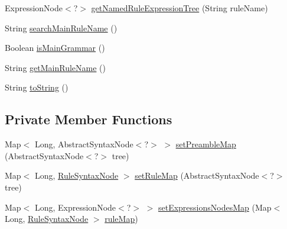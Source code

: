 \begin{DoxyCompactItemize}
\item 
Expression\-Node$<$?$>$ \hyperlink{classit_1_1emarolab_1_1cagg_1_1core_1_1language_1_1syntax_1_1GrammarPrimitive_a2e8aaff9990813d6a7c3d4f7888ac2d0}{get\-Named\-Rule\-Expression\-Tree} (String rule\-Name)
\item 
String \hyperlink{classit_1_1emarolab_1_1cagg_1_1core_1_1language_1_1syntax_1_1GrammarPrimitive_af96e79b0d9f2caadf59f3fba2c7da478}{search\-Main\-Rule\-Name} ()
\item 
Boolean \hyperlink{classit_1_1emarolab_1_1cagg_1_1core_1_1language_1_1syntax_1_1GrammarPrimitive_a5009bf574d9368b8cce4b1a726eed90d}{is\-Main\-Grammar} ()
\item 
String \hyperlink{classit_1_1emarolab_1_1cagg_1_1core_1_1language_1_1syntax_1_1GrammarPrimitive_a82656685c1fced207c2cb8a20bf977a7}{get\-Main\-Rule\-Name} ()
\item 
String \hyperlink{classit_1_1emarolab_1_1cagg_1_1core_1_1language_1_1syntax_1_1GrammarPrimitive_a00b7879160c2a900e64025f84fdc059c}{to\-String} ()
\end{DoxyCompactItemize}
\subsection*{Private Member Functions}
\begin{DoxyCompactItemize}
\item 
Map$<$ Long, Abstract\-Syntax\-Node$<$?$>$ $>$ \hyperlink{classit_1_1emarolab_1_1cagg_1_1core_1_1language_1_1syntax_1_1GrammarPrimitive_a83fd6dcd4026122ef2e5283c595ca380}{set\-Preamble\-Map} (Abstract\-Syntax\-Node$<$?$>$ tree)
\item 
Map$<$ Long, \hyperlink{classit_1_1emarolab_1_1cagg_1_1core_1_1language_1_1syntax_1_1abstractTree_1_1syntaxNodeType_1_1RuleSyntaxNode}{Rule\-Syntax\-Node} $>$ \hyperlink{classit_1_1emarolab_1_1cagg_1_1core_1_1language_1_1syntax_1_1GrammarPrimitive_a898cc7706fc3aaf4d2d6b7b6a20e53a4}{set\-Rule\-Map} (Abstract\-Syntax\-Node$<$?$>$ tree)
\item 
Map$<$ Long, Expression\-Node$<$?$>$ $>$ \hyperlink{classit_1_1emarolab_1_1cagg_1_1core_1_1language_1_1syntax_1_1GrammarPrimitive_a1ec6ca83054e11a6adecf0de412e06e1}{set\-Expressions\-Nodes\-Map} (Map$<$ Long, \hyperlink{classit_1_1emarolab_1_1cagg_1_1core_1_1language_1_1syntax_1_1abstractTree_1_1syntaxNodeType_1_1RuleSyntaxNode}{Rule\-Syntax\-Node} $>$ \hyperlink{classit_1_1emarolab_1_1cagg_1_1core_1_1language_1_1syntax_1_1GrammarPrimitive_a1c9fa16adecc71a44b6d893f62dba053}{rule\-Map})
\end{DoxyCompactItemize}
